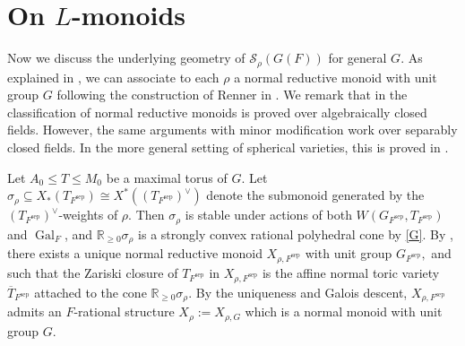\documentclass[10pt]{amsart}
\theoremstyle{definition}
\numberwithin{equation}{section}
\DeclareMathOperator{\Gal}{\mathrm{Gal}}
\numberwithin{equation}{subsection}
\newcommand{\RR}{\mathbb{R}}
\begin{document}




\section{On $L$-monoids}\label{sec:Lmonoids}


Now we discuss the underlying geometry of $\mathcal{S}_\rho(G(F))$ for general $G$. As explained in \cite[\S5.1]{Ngo:Hankel}, we can associate to each $\rho$ a normal reductive monoid with unit group $G$ following the construction of Renner in \cite[\S 5.1]{Renner:AlgebraMonoids}. We remark that in  \cite[\S 5.1]{Renner:AlgebraMonoids} the classification of normal reductive monoids is proved over algebraically closed fields. However, the same arguments with minor modification work over separably closed fields. In the more general setting of spherical varieties, this is proved in \cite{Wedhorn:Spherical}. 

Let $A_0\le T\le M_0$ be a maximal torus of $G$. Let $\sigma_{\rho}\subseteq X_*(T_{F^\mathrm{sep}}) \cong X^*((T_{F^\mathrm{sep}})^\vee)$ denote the submonoid generated by the $(T_{F^{\mathrm{sep}}})^\vee$-weights of $\rho$. Then $\sigma_{\rho}$ is stable under actions of both $W(G_{F^{\mathrm{sep}}},T_{F^{\mathrm{sep}}})$ and $\Gal_F$, and $\mathbb{R}_{\geq 0}\sigma_{\rho}$ is a strongly convex rational polyhedral cone by \eqref{G}. By \cite[Theorem 5.4]{Renner:AlgebraMonoids}, there exists a unique normal reductive monoid $X_{\rho,F^{\mathrm{sep}}}$ with unit group $G_{F^{\mathrm{sep}}},$ and such that the Zariski closure of $T_{F^{\mathrm{sep}}}$ in  $X_{\rho,F^{\mathrm{sep}}}$ is the affine normal toric variety $\overline{T}_{F^{\mathrm{sep}}}$ attached to the cone $\RR_{\ge 0}\sigma_{\rho}$. By the uniqueness and Galois descent, $X_{\rho,F^{\mathrm{sep}}}$ admits an $F$-rational structure $X_\rho:=X_{\rho,G}$ which is a normal monoid with unit group $G$. 

\end{document}
